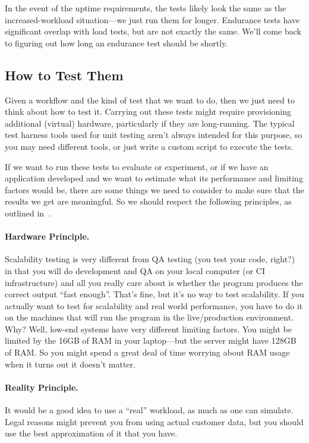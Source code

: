 In the event of the uptime requirements, the tests likely look the same as the increased-workload situation---we just run them for longer. Endurance tests have significant overlap with load tests, but are not exactly the same. We'll come back to figuring out how long an endurance test should be shortly.


\subsection*{How to Test Them}

Given a workflow and the kind of test that we want to do, then we just need to think about how to test it. Carrying out these tests might require provisioning additional (virtual) hardware, particularly if they are long-running. The typical test harness tools used for unit testing aren't always intended for this purpose, so you may need different tools, or just write a custom script to execute the tests.

If we want to run these tests to evaluate or experiment, or if we have an application developed and we want to estimate what its performance and limiting factors would be, there are some things we need to consider to make sure that the results we get are meaningful.  So we should respect the following principles, as outlined in~\cite{swps}.


\paragraph{Hardware Principle.} 
Scalability testing is very different from  QA testing (you test your code, right?) in that you will do development and QA on your local computer (or CI infrastructure) and all you really care about is whether the program produces the correct output ``fast enough''. That's fine, but it's no way to test scalability. If you actually want to test for scalability and real world performance, you have to do it on the machines that will run the program in the live/production environment. Why? Well, low-end systems have very different limiting factors. You might be limited by the 16GB of RAM in your laptop---but the server might have 128GB of RAM. So you might spend a great deal of time worrying about RAM usage when it turns out it doesn't matter.

\paragraph{Reality Principle.}
It would be a good idea to use a ``real'' workload, as much as one can simulate. Legal reasons might prevent you from using actual customer data, but you should use the best approximation of it that you have. 


